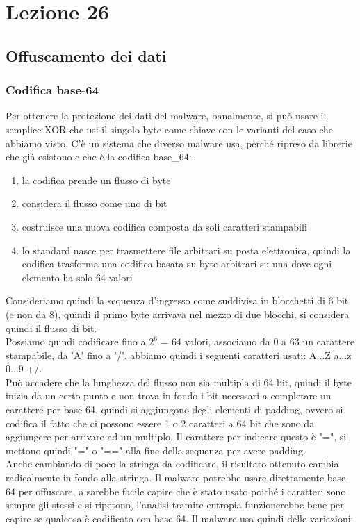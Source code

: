 \documentclass[12pt, oneside]{extbook}
\begin{document}
\chapter{Lezione 26}
\section{Offuscamento dei dati}
\subsection{Codifica base-64}
Per ottenere la protezione dei dati del malware, banalmente, si può usare il semplice XOR che usi il singolo byte come chiave con le varianti del caso che abbiamo visto. C'è un sistema che diverso malware usa, perché ripreso da librerie che già esistono e che è la codifica base\_64:
\begin{enumerate}
	\item la codifica prende un flusso di byte
	\item considera il flusso come uno di bit
	\item costruisce una nuova codifica composta da soli caratteri stampabili
	\item lo standard nasce per trasmettere file arbitrari su posta elettronica, quindi la codifica trasforma una codifica basata su byte arbitrari su una dove ogni elemento ha solo 64 valori
\end{enumerate}
Consideriamo quindi la sequenza d'ingresso come suddivisa in blocchetti di 6 bit (e non da 8), quindi il primo byte arrivava nel mezzo di due blocchi, si considera quindi il flusso di bit.\\Possiamo quindi codificare fino a $2^6$ = 64 valori, associamo da 0 a 63 un carattere stampabile, da 'A' fino a '/', abbiamo quindi i seguenti caratteri usati: A...Z a...z 0...9 +/.\\Può accadere che la lunghezza del flusso non sia multipla di 64 bit, quindi il byte inizia da un certo punto e non trova in fondo i bit necessari a completare un carattere per base-64, quindi si aggiungono degli elementi di padding, ovvero si codifica il fatto che ci possono essere 1 o 2 caratteri a 64 bit che sono da aggiungere per arrivare ad un multiplo. Il carattere per indicare questo è "=", si mettono quindi "=" o "==" alla fine della sequenza per avere padding.\\Anche cambiando di poco la stringa da codificare, il risultato ottenuto cambia radicalmente in fondo alla stringa. Il malware potrebbe usare direttamente base-64 per offuscare, a sarebbe facile capire che è stato usato poiché i caratteri sono sempre gli stessi e si ripetono, l'analisi tramite entropia funzionerebbe bene per capire se qualcosa è codificato con base-64. Il malware usa quindi delle variazioni:
\end{document}
